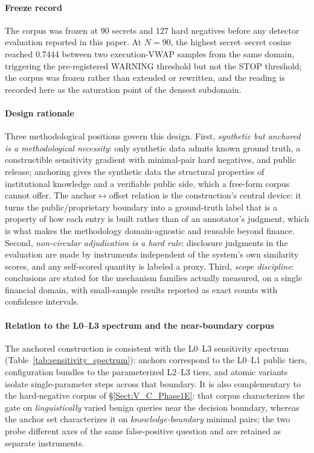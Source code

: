 \documentclass[journal]{IEEEtran}
\begin{document}
\paragraph{Freeze record}
The corpus was frozen at 90 secrets and 127 hard negatives before any
detector evaluation reported in this paper. At $N{=}90$, the highest
secret--secret cosine reached 0.7444 between two execution-VWAP samples from
the same domain, triggering the pre-registered WARNING threshold but not the
STOP threshold; the corpus was frozen rather than extended or rewritten, and
the reading is recorded here as the saturation point of the densest
subdomain.

\paragraph{Design rationale}
Three methodological positions govern this design. First, \emph{synthetic but
anchored is a methodological necessity}: only synthetic data admits known
ground truth, a constructible sensitivity gradient with minimal-pair hard
negatives, and public release; anchoring gives the synthetic data the
structural properties of institutional knowledge and a verifiable public
side, which a free-form corpus cannot offer. The anchor$\leftrightarrow$offset relation is the construction's central device: it turns the public/proprietary boundary into a ground-truth label that is a property of how each entry is built rather than of an annotator's judgment, which is what makes the methodology domain-agnostic and reusable beyond finance. Second, \emph{non-circular
adjudication is a hard rule}: disclosure judgments in the evaluation are made
by instruments independent of the system's own similarity scores, and any
self-scored quantity is labeled a proxy. Third, \emph{scope discipline}:
conclusions are stated for the mechanism families actually measured, on a
single financial domain, with small-sample results reported as exact counts
with confidence intervals.

\paragraph{Relation to the L0--L3 spectrum and the near-boundary corpus}
The anchored construction is consistent with the L0--L3 sensitivity spectrum
(Table~\ref{tab:sensitivity_spectrum}): anchors correspond to the L0--L1
public tiers, configuration bundles to the parameterized L2--L3 tiers, and
atomic variants isolate single-parameter steps across that boundary. It is
also complementary to the hard-negative corpus of \S\ref{Sect:V_C_Phase1E}:
that corpus characterizes the gate on \emph{linguistically} varied benign
queries near the decision boundary, whereas the anchor set characterizes it on
\emph{knowledge-boundary} minimal pairs; the two probe different axes of the
same false-positive question and are retained as separate instruments.
\end{document}
